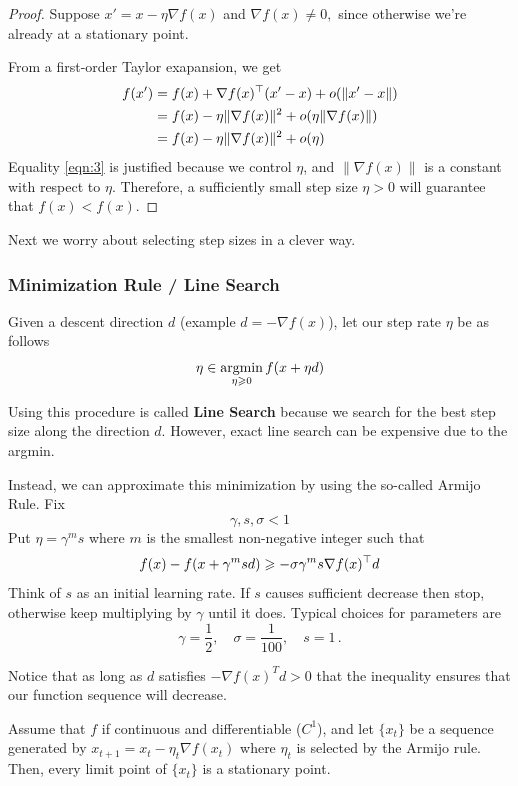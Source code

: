 \begin{proof}
Suppose $x' = x - \eta \nabla f(x)$ and $\nabla f(x)\ne 0,$ since otherwise
we're already at a stationary point.

From a first-order Taylor exapansion, we get
\begin{align}
    f(x') &= f(x) + \nabla f(x)^\top (x' - x) + o(\|x' - x\|) \nonumber\\
    &= f(x) - \eta\|\nabla f(x)\|^2 + o(\eta \|\nabla f(x)\|) \nonumber\\
    &= f(x) - \eta \|\nabla f(x)\|^2 + o(\eta) \label{eqn:3}
\end{align}
Equality \ref{eqn:3} is justified because we control $\eta$, and $\|\nabla
f(x)\|$ is a constant with respect to $\eta$. Therefore, a sufficiently small
step size $\eta>0$ will guarantee that $f(x)<f(x).$
\end{proof}

Next we worry about selecting step sizes in a clever way.

\subsubsection{Minimization Rule / Line Search}

Given a descent direction $d$ (example $d = - \nabla f(x)$), let our step rate $\eta$ be as follows
\[
    \eta \in \mathop{\rm argmin}_{\eta \geqslant 0} f(x + \eta d)
\]

Using this procedure is called \textbf{Line Search} because we search for the best step size along the direction $d$. However, exact line search can be expensive due to the argmin.

Instead, we can approximate this minimization by using the so-called Armijo Rule. 
Fix 
\[
    \gamma, s, \sigma < 1
\]
Put $\eta = \gamma^m s$ where $m$ is the smallest non-negative integer such that
\[
    f(x) - f(x + \gamma^m s d) \geqslant - \sigma \gamma^m s \nabla f(x)^\top d
\]
Think of $s$ as an initial learning rate. If $s$ causes sufficient decrease then
stop, otherwise keep multiplying by $\gamma$ until it does. 
Typical choices for parameters are 
\[
    \gamma = \frac{1}{2},\quad \sigma = \frac{1}{100},\quad s = 1\,.
\]

Notice that as long as $d$ satisfies $-\nabla f(x)^Td > 0$ that the inequality ensures that our function sequence will decrease.

\begin{proposition}
Assume that $f$ if continuous and differentiable ($C^1$), and let $\{x_t\}$ be a sequence generated by $x_{t+1} = x_t - \eta_t \nabla f(x_t)$ where $\eta_t$ is selected by the Armijo rule. Then, every limit point of $\{x_t\}$ is a stationary point.
\end{proposition}

